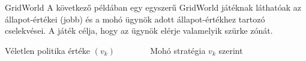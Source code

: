 \documentclass[english, aspectratio=169]{beamer}
\begin{document}
\begin{frame}{GridWorld}
A következő példában egy egyszerű GridWorld játéknak láthatóak az állapot-értékei (jobb) és a mohó ügynök adott állapot-értékhez tartozó cselekvései. A játék célja, hogy az ügynök elérje valamelyik szürke zónát. 
\begin{center}
Véletlen politika értéke $(v_{k})\;\;\;\;\;\;\;\;\;\;\;\;\;\;\;$Mohó stratégia $v_{k}$ szerint

\end{center}
\end{frame}
\end{document}
